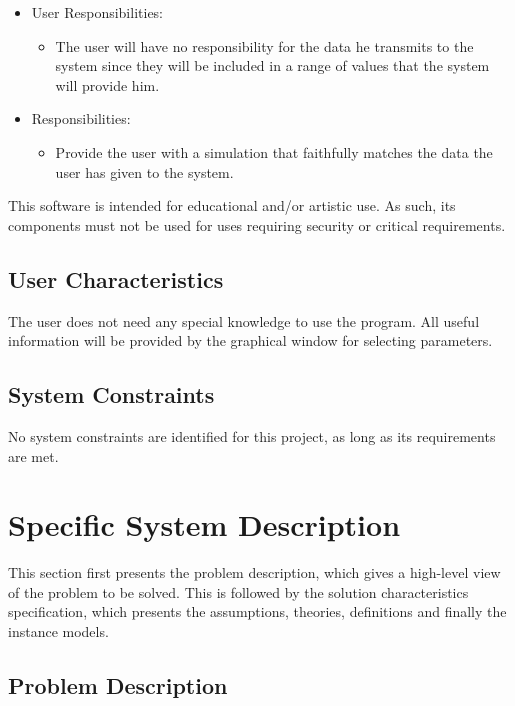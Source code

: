 \documentclass[12pt]{article}
\begin{document}
\begin{itemize}
\item User Responsibilities:
\begin{itemize}
\item The user will have no responsibility for the data he transmits to the system since they will be included in a range of values 
that the system will provide him.
\end{itemize}
\item \progname{} Responsibilities:
\begin{itemize}
\item Provide the user with a simulation that faithfully matches the data the user has given to the system.
\end{itemize}
\end{itemize}

This software is intended for educational and/or artistic use. 
As such, its components must not be used for uses requiring security or critical requirements.

\subsection{User Characteristics} \label{SecUserCharacteristics}

The user does not need any special knowledge to use the program. 
All useful information will be provided by the graphical window for selecting parameters.

\subsection{System Constraints}

No system constraints are identified for this project, as long as its requirements are met.

\section{Specific System Description}

This section first presents the problem description, which gives a high-level
view of the problem to be solved.  This is followed by the solution characteristics
specification, which presents the assumptions, theories, definitions and finally
the instance models.

\subsection{Problem Description} \label{Sec_pd}
\end{document}

